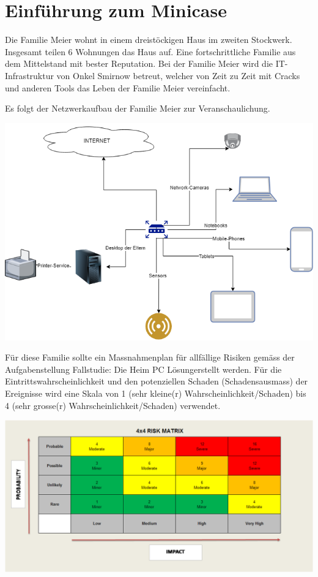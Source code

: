 \section{Einführung zum Minicase}

Die Familie Meier wohnt in einem dreistöckigen Haus im zweiten Stockwerk. Insgesamt teilen 6 Wohnungen das Haus auf. Eine fortschrittliche Familie aus dem Mittelstand mit bester Reputation.
Bei der Familie Meier wird die IT-Infrastruktur von Onkel Smirnow betreut, welcher von Zeit zu Zeit mit Cracks und anderen Tools das Leben der Familie Meier vereinfacht.


Es folgt der Netzwerkaufbau der Familie Meier zur Veranschaulichung.


\includegraphics[width=14cm]{./Netzwerk.png}

Für diese Familie sollte ein Massnahmenplan für allfällige Risiken gemäss der Aufgabenstellung \grqq Fallstudie: Die Heim PC Lösung\grqq \space erstellt werden. Für die Eintrittswahrscheinlichkeit und den potenziellen Schaden (Schadensausmass) der Ereignisse wird eine Skala von 1 (sehr kleine(r) Wahrscheinlichkeit/Schaden) bis 4 (sehr grosse(r) Wahrscheinlichkeit/Schaden) verwendet.



\includegraphics[width=\textwidth]{./Risikomatrix.png}
